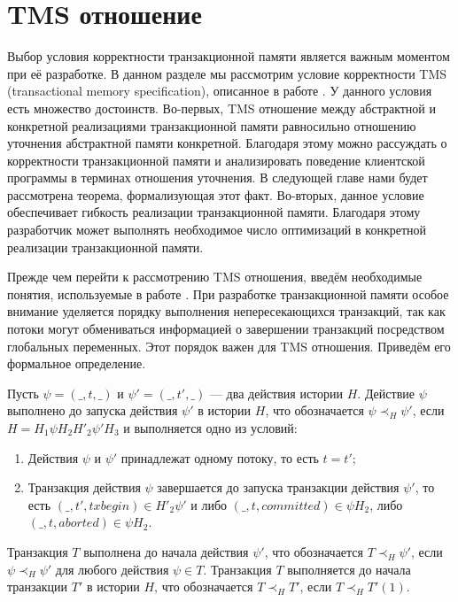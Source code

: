 \section{TMS отношение}
Выбор условия корректности транзакционной памяти является важным моментом при её разработке. В данном разделе мы рассмотрим условие корректности TMS (transactional memory specification), описанное в работе \cite{tms_article}. У данного условия есть множество достоинств. Во-первых, TMS отношение между абстрактной и конкретной реализациями транзакционной памяти равносильно отношению уточнения абстрактной памяти конкретной. Благодаря этому можно рассуждать о корректности транзакционной памяти и анализировать поведение клиентской программы в терминах отношения уточнения. В следующей главе нами будет рассмотрена теорема, формализующая этот факт. Во-вторых, данное условие обеспечивает гибкость реализации транзакционной памяти. Благодаря этому разработчик может выполнять необходимое число оптимизаций в конкретной реализации транзакционной памяти.

Прежде чем перейти к рассмотрению TMS отношения, введём необходимые понятия, используемые в работе \cite{tms_article}. При разработке транзакционной памяти особое внимание уделяется порядку выполнения непересекающихся транзакций, так как потоки могут обмениваться информацией о завершении транзакций посредством глобальных переменных. Этот порядок важен для TMS отношения. Приведём его формальное определение.

\begin{mydefinition}\label{order}
Пусть $\psi = (\_, t, \_)$ и $\psi' = (\_, t', \_)$ --- два действия истории $H$. Действие $\psi$ выполнено до запуска действия $\psi'$ в истории $H$, что обозначается $\psi \prec_H \psi'$, если $H = H_1\psi{H_2}H'_2\psi'{H_3}$ и выполняется одно из условий:  
\begin{enumerate}
\item Действия $\psi$ и $\psi'$ принадлежат одному потоку, то есть $t = t'$;
\item Транзакция действия $\psi$ завершается до запуска транзакции действия $\psi'$, то есть $(\_, t', txbegin) \in H'_2\psi'$ и либо $(\_, t, committed) \in \psi{H_2}$, либо $(\_, t, aborted) \in \psi{H_2}$. 
\end{enumerate}
Транзакция $T$ выполнена до начала действия $\psi'$, что обозначается $T \prec_H \psi'$, если $\psi \prec_H \psi'$ для любого действия $\psi \in T$. 
Транзакция $T$ выполняется до начала транзакции $T'$ в истории $H$, что обозначается $T \prec_H T'$, если $T \prec_H T'(1)$.
\end{mydefinition}

